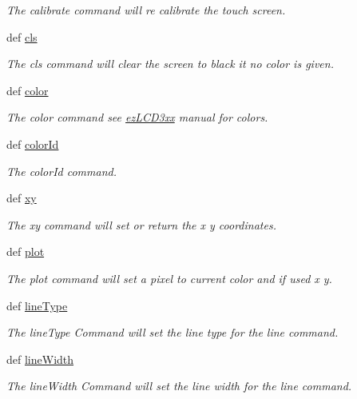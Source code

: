 \begin{DoxyCompactItemize}
\begin{DoxyCompactList}\small\item\em The calibrate command will re calibrate the touch screen. \end{DoxyCompactList}\item 
def \hyperlink{group___drawing_ga3524b7a565ceaa5e5290a94e870073be}{cls}
\begin{DoxyCompactList}\small\item\em The cls command will clear the screen to black it no color is given. \end{DoxyCompactList}\item 
def \hyperlink{group___drawing_ga39b2d04e242f81f928f6e130e6fab2c7}{color}
\begin{DoxyCompactList}\small\item\em The color command see \hyperlink{namespacemodule_1_1ez_l_c_d3xx}{ez\-L\-C\-D3xx} manual for colors. \end{DoxyCompactList}\item 
def \hyperlink{group___drawing_ga08d8eb362a01b246033c3ec2a5944dd3}{color\-Id}
\begin{DoxyCompactList}\small\item\em The color\-Id command. \end{DoxyCompactList}\item 
def \hyperlink{group___drawing_ga93fdd029cb3a4fd28f006d9dac12de14}{xy}
\begin{DoxyCompactList}\small\item\em The xy command will set or return the x y coordinates. \end{DoxyCompactList}\item 
def \hyperlink{group___drawing_gaad72ea59743ea85183832ede89d9eb22}{plot}
\begin{DoxyCompactList}\small\item\em The plot command will set a pixel to current color and if used x y. \end{DoxyCompactList}\item 
def \hyperlink{group___drawing_gafbc7a80b227e1e7d9fb6a587a63aaba3}{line\-Type}
\begin{DoxyCompactList}\small\item\em The line\-Type Command will set the line type for the line command. \end{DoxyCompactList}\item 
def \hyperlink{group___drawing_ga4a128e755251c2605c984110eb056fad}{line\-Width}
\begin{DoxyCompactList}\small\item\em The line\-Width Command will set the line width for the line command. \end{DoxyCompactList}\item 

\end{DoxyCompactItemize}
